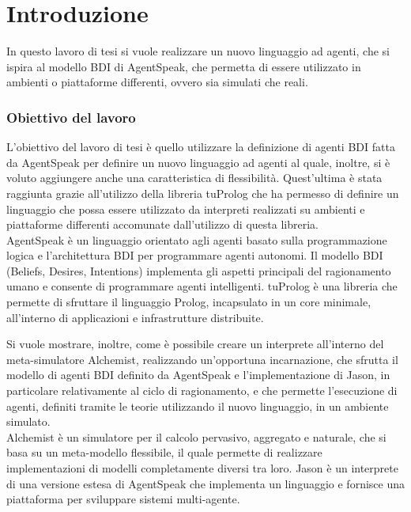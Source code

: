 \chapter{Introduzione}
\lhead[\fancyplain{}{\bfseries\thepage}]{\fancyplain{}{\bfseries\rightmark}}
In questo lavoro di tesi si vuole realizzare un nuovo linguaggio ad agenti, che si ispira al modello BDI di AgentSpeak, che permetta di essere utilizzato in ambienti o piattaforme differenti, ovvero sia simulati che reali.

\subsection*{Obiettivo del lavoro}
L'obiettivo del lavoro di tesi è quello utilizzare la definizione di agenti BDI fatta da AgentSpeak per definire un nuovo linguaggio ad agenti al quale, inoltre, si è voluto aggiungere anche una caratteristica di flessibilità. Quest'ultima è stata raggiunta grazie all'utilizzo della libreria tuProlog che ha permesso di definire un linguaggio che possa essere utilizzato da interpreti realizzati su ambienti e piattaforme differenti accomunate dall'utilizzo di questa libreria.
\\
AgentSpeak è un linguaggio orientato agli agenti basato sulla programmazione logica e l'architettura BDI per programmare agenti autonomi. Il modello BDI (Beliefs, Desires, Intentions) implementa gli aspetti principali del ragionamento umano e consente di programmare agenti intelligenti.
tuProlog è una libreria che permette di sfruttare il linguaggio Prolog, incapsulato in un core minimale, all'interno di applicazioni e infrastrutture distribuite.

Si vuole mostrare, inoltre, come è possibile creare un interprete all'interno del meta-simulatore Alchemist, realizzando un'opportuna incarnazione, che sfrutta il modello di agenti BDI definito da AgentSpeak e l'implementazione di Jason, in particolare relativamente al ciclo di ragionamento, e che permette l'esecuzione di agenti, definiti tramite le teorie utilizzando il nuovo linguaggio, in un ambiente simulato.
\\
Alchemist è un simulatore per il calcolo pervasivo, aggregato e naturale, che si basa su un meta-modello flessibile, il quale permette di realizzare implementazioni di modelli completamente diversi tra loro.
Jason è un interprete di una versione estesa di AgentSpeak che implementa un linguaggio e fornisce una piattaforma per sviluppare sistemi multi-agente.

